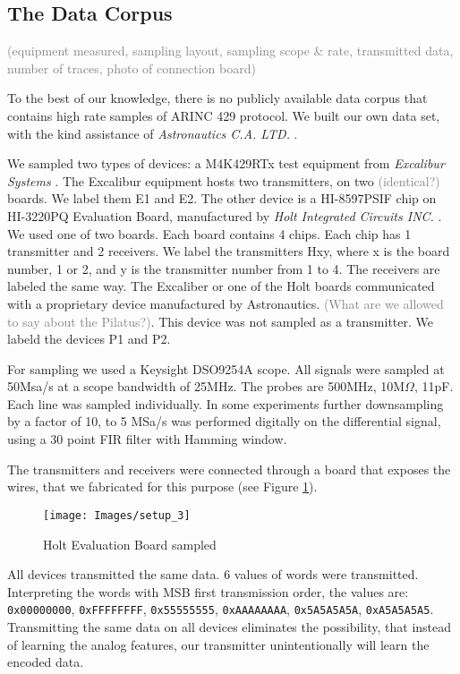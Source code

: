 \documentclass[conference]{IEEEtran}
\begin{document}
\subsection{The Data Corpus}
  \textcolor{gray}{(equipment measured, sampling layout, sampling scope \& rate, transmitted data, number of traces, photo of connection board)}
  
  To the best of our knowledge, there is no publicly available data corpus that contains high rate samples of ARINC 429 protocol. We built our own data set, with the kind assistance of \textit{Astronautics C.A. LTD.} \cite{}.
  
  We sampled two types of devices: a M4K429RTx test equipment from \textit{Excalibur Systems} \cite{}. The Excalibur equipment hosts two transmitters, on two \textcolor{gray}{(identical?)} boards. We label them E1 and E2. The other device is a HI-8597PSIF chip on HI-3220PQ Evaluation Board, manufactured by \textit{Holt Integrated Circuits INC.} \cite{}. We used one of two boards. Each board contains 4 chips. Each chip has 1 transmitter and 2 receivers. We label the transmitters H{x}{y}, where x is the board number, 1 or 2, and y is the transmitter number from 1 to 4. The receivers are labeled the same way. The Excaliber or one of the Holt boards communicated with a proprietary device manufactured by Astronautics. \textcolor{gray}{(What are we allowed to say about the Pilatus?)}. This device was not sampled as a transmitter. We labeld the devices P1 and P2.
  
  For sampling we used a Keysight DSO9254A scope. All signals were sampled at 50Msa/s at a scope bandwidth of 25MHz. The probes are 500MHz, 10M\(\Omega\), 11pF. Each line was sampled individually. In some experiments further downsampling by a factor of 10, to 5 MSa/s was performed digitally on the differential signal, using a 30 point FIR filter with Hamming window.
  
  The transmitters and receivers were connected through a board that exposes the wires, that we fabricated for this purpose (see Figure \ref{fig:SetupImage}).
  
  \begin{figure}[t]
    \centering
    \texttt{[image: Images/setup\_3]}
    \caption{Holt Evaluation Board sampled}
    \label{fig:SetupImage}
  \end{figure}
  
  All devices transmitted the same data. 6 values of words were transmitted. Interpreting the words with MSB first transmission order, the values are: \texttt{0x00000000}, \texttt{0xFFFFFFFF}, \texttt{0x55555555}, \texttt{0xAAAAAAAA}, \texttt{0x5A5A5A5A}, \texttt{0xA5A5A5A5}. Transmitting the same data on all devices eliminates the possibility, that instead of learning the analog features, our transmitter unintentionally will learn the encoded data.
  
\end{document}
